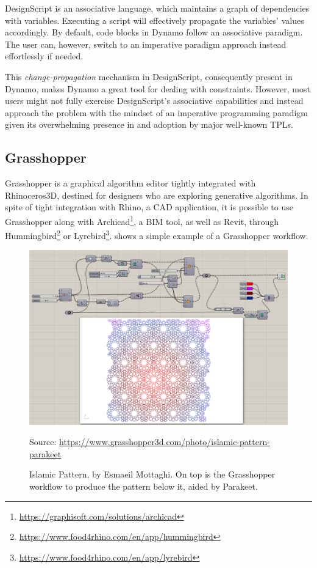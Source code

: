 DesignScript is an associative language, which maintains a graph of dependencies
with variables.  Executing a script will effectively propagate the variables'
values accordingly.  By default, code blocks in Dynamo follow an associative
paradigm.  The user can, however, switch to an imperative paradigm approach
instead effortlessly if needed.

This \textit{change-propagation} mechanism in DesignScript, consequently present
in Dynamo, makes Dynamo a great tool for dealing with constraints.  However,
most users might not fully exercise DesignScript's associative capabilities and
instead approach the problem with the mindset of an imperative programming
paradigm given its overwhelming presence in and adoption by major well-known
\acp{TPL}.

\subsection{Grasshopper}%
\label{sec:related.ad.grasshopper}

Grasshopper is a graphical algorithm editor tightly integrated with
Rhinoceros3D, destined for designers who are exploring generative algorithms.
In spite of tight integration with Rhino, a \ac{CAD} application, it is possible
to use Grasshopper along with
Archicad\textsuperscript{\textregistered}\footnote{\url{https://graphisoft.com/solutions/archicad}},
a \ac{BIM} tool, as well as Revit, through
Hummingbird\footnote{\url{https://www.food4rhino.com/en/app/hummingbird}} or
Lyrebird\footnote{\url{https://www.food4rhino.com/en/app/lyrebird}}.
 shows a simple example of a
Grasshopper workflow.

\begin{figure}[htb]
  \includegraphics[width=\linewidth]{fig/grasshopper-islamic-pattern}
  \begin{minipage}{\linewidth}
  \scriptsize Source:
  \url{https://www.grasshopper3d.com/photo/islamic-pattern-parakeet}
  \end{minipage}
  \caption[Islamic Pattern in Grasshopper using Parakeet]{
    Islamic Pattern, by Esmaeil Mottaghi.  On top is the Grasshopper workflow to
    produce the pattern below it, aided by
    Parakeet.\footnotemark}%
  \label{fig:related.ad.grasshopper.islamic-pattern}
\end{figure}

